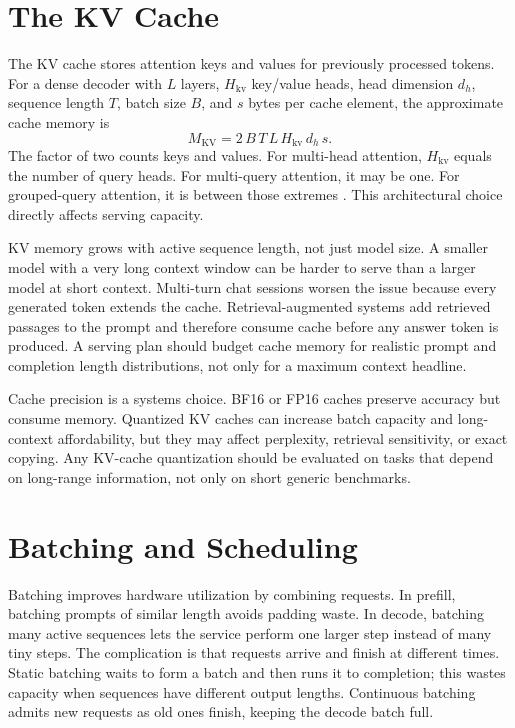 \section{The KV Cache}
\label{sec:kv-cache}

The KV cache stores attention keys and values for previously processed tokens. For a dense decoder with $L$ layers, $H_{\mathrm{kv}}$ key/value heads, head dimension $d_h$, sequence length $T$, batch size $B$, and $s$ bytes per cache element, the approximate cache memory is
\begin{equation}
  M_{\mathrm{KV}}
  =
  2\,B\,T\,L\,H_{\mathrm{kv}}\,d_h\,s.
\end{equation}
The factor of two counts keys and values. For multi-head attention, $H_{\mathrm{kv}}$ equals the number of query heads. For multi-query attention, it may be one. For grouped-query attention, it is between those extremes \cite{shazeer2019fast,ainslie2023gqa}. This architectural choice directly affects serving capacity.

KV memory grows with active sequence length, not just model size. A smaller model with a very long context window can be harder to serve than a larger model at short context. Multi-turn chat sessions worsen the issue because every generated token extends the cache. Retrieval-augmented systems add retrieved passages to the prompt and therefore consume cache before any answer token is produced. A serving plan should budget cache memory for realistic prompt and completion length distributions, not only for a maximum context headline.

Cache precision is a systems choice. BF16 or FP16 caches preserve accuracy but consume memory. Quantized KV caches can increase batch capacity and long-context affordability, but they may affect perplexity, retrieval sensitivity, or exact copying. Any KV-cache quantization should be evaluated on tasks that depend on long-range information, not only on short generic benchmarks.

\section{Batching and Scheduling}
\label{sec:batching-scheduling}

Batching improves hardware utilization by combining requests. In prefill, batching prompts of similar length avoids padding waste. In decode, batching many active sequences lets the service perform one larger step instead of many tiny steps. The complication is that requests arrive and finish at different times. Static batching waits to form a batch and then runs it to completion; this wastes capacity when sequences have different output lengths. Continuous batching admits new requests as old ones finish, keeping the decode batch full.

